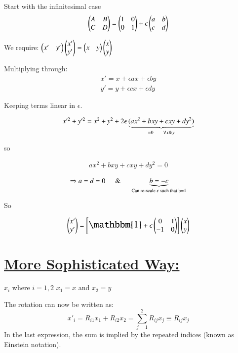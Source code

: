 {Start with the infinitesimal case
\begin{equation*}
\begin{pmatrix} A & B \\ C & D \end{pmatrix} = \begin{pmatrix} 1 &  0  \\ 0 & 1 \end{pmatrix} + \epsilon \begin{pmatrix} a & b  \\ c & d \end{pmatrix}
\end{equation*}

We require:
$\begin{pmatrix} x' & y' \end{pmatrix} \begin{pmatrix} x' \\ y' \end{pmatrix} = \begin{pmatrix} x & y \end{pmatrix} \begin{pmatrix} x \\ y \end{pmatrix} $ 

Multiplying through:
\begin{eqnarray*}
x' = x + \epsilon a x + \epsilon b y \\
y' = y + \epsilon  c x + \epsilon d y
\end{eqnarray*}


Keeping terms linear in $\epsilon$.

\begin{eqnarray*}
\textstyle
x'^2 + y'^2 = x^2 + y^2  + 2\epsilon\underbrace{(ax^2 + bxy + cxy + dy^2)}_{ =0 \hspace*{0.2in} \forall x \& y}
\end{eqnarray*}

so 

\begin{eqnarray*}
\textstyle
ax^2 + bxy + cxy + dy^2 = 0
\end{eqnarray*}

\begin{eqnarray*}
\textstyle
\Rightarrow a = d = 0  \hspace*{0.2in} \&   \hspace*{0.2in}  \underbrace{b=-c}_{\text{Can re-scale $\epsilon$ such that b=1}}
\end{eqnarray*}

So 

\begin{eqnarray*}
\xyprime = \left[ \mathlarger{\mathlarger{\mathbbm{1}}} + \epsilon   \IMatrix \right]\xy
\end{eqnarray*}

\section*{\underline{More Sophisticated Way:}}

$x_i$ where $i = 1,2$    $x_1 = x$ and $x_2 = y$

The rotation can now be written as:\\
\begin{equation*}
x'_i = R_{i1}x_1 + R_{i2}x_2 = \sum\limits_{j=1}^2 R_{ij} x_j \equiv R_{ij}x_j
\end{equation*}
In the last expression, the sum is implied by the repeated indices (known as Einstein notation).

}
